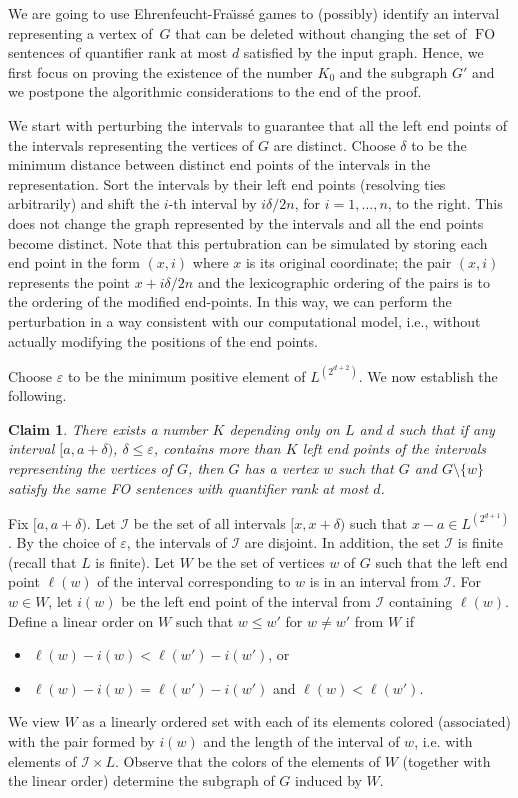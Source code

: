\documentclass{CSML}
\newcommand{\FO}{\ensuremath{\operatorname{FO}}\xspace}
\newcommand{\II}{\mathcal{I}}
\theoremstyle{plain}\newtheorem{claim}[thm]{Claim}
\begin{document}
\proof
We are going to use Ehrenfeucht-Fra{\"\i}ss\'e games to (possibly) identify an interval
representing a vertex of~$G$ that can be deleted without changing the set
of \FO sentences of quantifier rank at most $d$ satisfied by the input graph.
Hence, we first focus on proving the existence of the number $K_0$ and the subgraph $G'$ and
we postpone the algorithmic considerations to the end of the proof.

We start with perturbing the intervals to guarantee that all the left end points of the intervals representing the vertices of $G$ are distinct.
Choose $\delta$ to be the minimum distance between distinct end points of the intervals in the representation.
Sort the intervals by their left end points (resolving ties arbitrarily) and
shift the $i$-th interval by $i\delta/2n$, for $i=1,\ldots,n$, to the right.
This does not change the graph represented by the intervals and all the end points become distinct.
Note that this pertubration can be simulated by storing each end point in the form $(x,i)$ where $x$ is its original coordinate;
the pair $(x,i)$ represents the point $x+i\delta/2n$ and the lexicographic ordering of the pairs is to the ordering of the modified end-points.
In this way, we can perform the perturbation in a way consistent with our computational model,
i.e., without actually modifying the positions of the end points.

Choose $\varepsilon$ to be the minimum positive element of $L^{(2^{d+2})}$. We now establish the following.
\begin{claim}
There exists a number $K$ depending only on $L$ and $d$ such that
if any interval $[a,a+\delta)$, $\delta\le\varepsilon$, contains more than $K$ left end points of the intervals representing the vertices of $G$,
then $G$ has a vertex $w$ such that $G$ and $G\setminus\{w\}$ satisfy the same FO sentences with quantifier rank at most $d$.
\end{claim}
Fix $[a,a+\delta)$. Let $\II$ be the set of all intervals $[x,x+\delta)$ such that $x-a\in L^{(2^{d+1})}$.
By the choice of $\varepsilon$, the intervals of $\II$ are disjoint.
In addition, the set $\II$ is finite (recall that $L$ is finite).
Let $W$ be the set of vertices $w$ of $G$ such that the left end point $\ell(w)$ of the interval corresponding to $w$ is in an interval from $\II$.
For $w\in W$, let $i(w)$ be the left end point of the interval from $\II$ containing $\ell(w)$.
Define a linear order on $W$ such that $w\le w'$ for $w\not=w'$ from $W$ if
\begin{itemize}
\item $\ell(w)-i(w)<\ell(w')-i(w')$, or
\item $\ell(w)-i(w)=\ell(w')-i(w')$ and $\ell(w)<\ell(w')$.
\end{itemize}
We view $W$ as a linearly ordered set with each of its elements colored (associated) with the pair formed by $i(w)$ and the length of the interval of $w$,
i.e. with elements of $\II\times L$.
Observe that the colors of the elements of $W$ (together with the linear order) determine the subgraph of $G$ induced by $W$.
\end{document}
